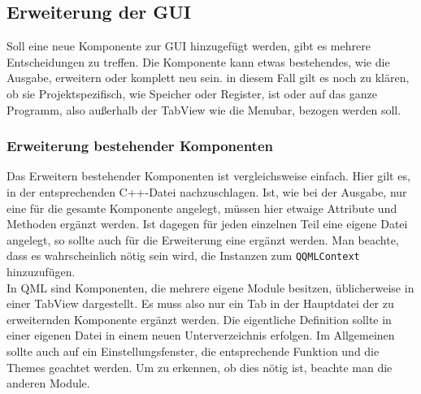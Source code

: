 \subsection{Erweiterung der GUI}
Soll eine neue Komponente zur GUI hinzugefügt werden, gibt es mehrere Entscheidungen zu treffen. Die Komponente kann etwas bestehendes, wie die Ausgabe, erweitern oder komplett neu sein. in diesem Fall gilt es noch zu klären, ob sie Projektspezifisch, wie Speicher oder Register, ist oder auf das ganze Programm, also außerhalb der TabView wie die Menubar, bezogen werden soll.

\subsubsection{Erweiterung bestehender Komponenten}
Das Erweitern bestehender Komponenten ist vergleichsweise einfach. Hier gilt es, in der entsprechenden C++-Datei nachzuschlagen. Ist, wie bei der Ausgabe, nur eine für die gesamte Komponente angelegt, müssen hier etwaige Attribute und Methoden ergänzt werden. Ist dagegen für jeden einzelnen Teil eine eigene Datei angelegt, so sollte auch für die Erweiterung eine ergänzt werden. Man beachte, dass es wahrscheinlich nötig sein wird, die Instanzen zum \texttt{QQMLContext} hinzuzufügen.\\
In QML sind Komponenten, die mehrere eigene Module besitzen, üblicherweise in einer TabView dargestellt. Es muss also nur ein Tab in der Hauptdatei der zu erweiternden Komponente ergänzt werden. Die eigentliche Definition sollte in einer eigenen Datei in einem neuen Unterverzeichnis erfolgen. Im Allgemeinen sollte auch auf ein Einstellungsfenster, die entsprechende Funktion und die Themes geachtet werden. Um zu erkennen, ob dies nötig ist, beachte man die anderen Module.

